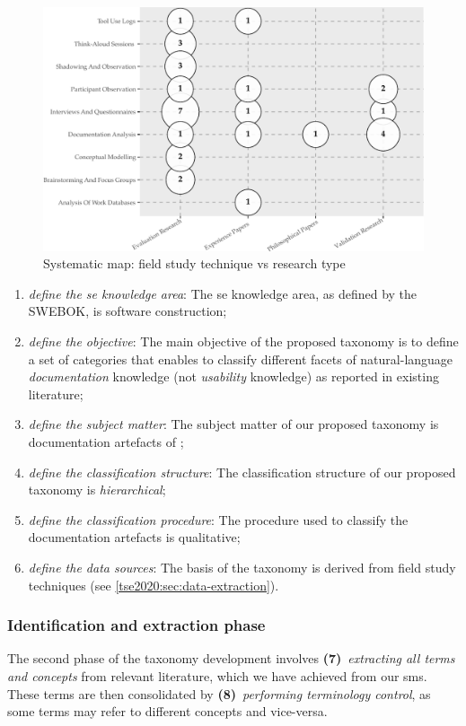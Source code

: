 \begin{figure}[t!]
  \centering
  \includegraphics[width=.8\linewidth]{sms}
  \caption[A systematic map of API documentation knowledge studies]{Systematic map: field study technique vs research type}
  \label{tse2020:fig:sms}
\end{figure}

\begin{enumerate}[label=\textbf{(\arabic*)}]
  \item \textit{define the \gls{se} knowledge area}: The \gls{se} knowledge area, as defined by the SWEBOK, is software construction;
  \item \textit{define the objective}: The main objective of the proposed taxonomy is to define a set of categories that enables to classify different facets of natural-language  \textit{documentation} knowledge (not  \textit{usability} knowledge) as reported in existing literature;
  \item \textit{define the subject matter}: The subject matter of our proposed taxonomy is  documentation artefacts of ;
  \item \textit{define the classification structure}: The classification structure of our  proposed taxonomy is \textit{hierarchical};
  \item \textit{define the classification procedure}: The procedure used to classify the documentation artefacts is qualitative; 
  \item \textit{define the data sources}: The basis of the taxonomy is derived from field study techniques (see \cref{tse2020:sec:data-extraction}).
\end{enumerate}

\subsubsection{Identification and extraction phase} The second phase of the taxonomy development involves \textbf{(7)}~\textit{extracting all terms and concepts} from relevant literature, which we have achieved from our \gls{sms}. These terms are then consolidated by \textbf{(8)}~\textit{performing terminology control}, as some terms may refer to different concepts and vice-versa.

